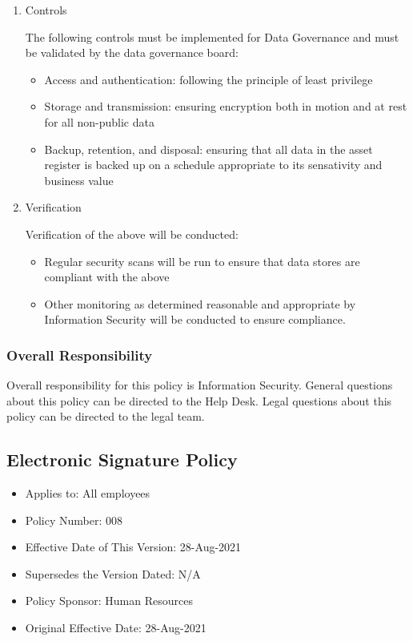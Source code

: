 \documentclass[stu]{apa7}
\begin{document}
\begin{enumerate}
\item Controls
\label{sec:org97cef61}

The following controls must be implemented for Data Governance and must be validated by the data governance board:

\begin{itemize}
\item Access and authentication: following the principle of least privilege
\item Storage and transmission: ensuring encryption both in motion and at rest for all non-public data
\item Backup, retention, and disposal: ensuring that all data in the asset register is backed up on a schedule appropriate to its sensativity and business value
\end{itemize}

\item Verification
\label{sec:orgcee0b85}

Verification of the above will be conducted:

\begin{itemize}
\item Regular security scans will be run to ensure that data stores are compliant with the above
\item Other monitoring as determined reasonable and appropriate by Information Security will be conducted to ensure compliance.
\end{itemize}
\end{enumerate}

\subsubsection{Overall Responsibility}
\label{sec:orgff93843}

Overall responsibility for this policy is Information Security. General questions about this policy can be directed to the Help Desk. Legal questions about this policy can be directed to the legal team.

\subsection{Electronic Signature Policy}
\label{sec:org3e71001}

\begin{itemize}
\item Applies to: All employees
\item Policy Number: 008
\item Effective Date of This Version: 28-Aug-2021
\item Supersedes the Version Dated: N/A
\item Policy Sponsor: Human Resources
\item Original Effective Date: 28-Aug-2021
\end{itemize}
\end{document}
